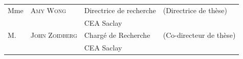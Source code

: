 \begin{titlepage}
\begin{textblock}{14}
\begin{center}
\begin{tabular}{llll}
				Mme   & \textsc{Amy Wong}          & Directrice de recherche & (Directrice de thèse)   \\
				\null & \null                      & CEA Saclay              &                         \\ 
				
				M.    & \textsc{John Zoidberg}     & Chargé de Recherche     & (Co-directeur de thèse) \\
				\null & \null                      & CEA Saclay              &                         \\ 		
			\end{tabular}
		\end{center}
	\end{textblock}
\end{titlepage}